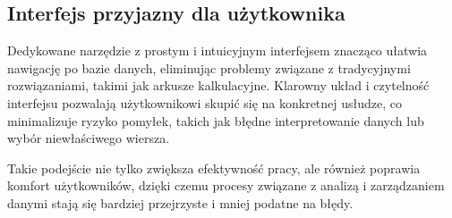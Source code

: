 \subsection{Interfejs przyjazny dla użytkownika}
Dedykowane narzędzie z prostym i intuicyjnym interfejsem znacząco ułatwia nawigację po bazie danych, eliminując problemy związane z tradycyjnymi rozwiązaniami, takimi jak arkusze kalkulacyjne. Klarowny układ i czytelność interfejsu pozwalają użytkownikowi skupić się na konkretnej usłudze, co minimalizuje ryzyko pomyłek, takich jak błędne interpretowanie danych lub wybór niewłaściwego wiersza.

Takie podejście nie tylko zwiększa efektywność pracy, ale również poprawia komfort użytkowników, dzięki czemu procesy związane z analizą i zarządzaniem danymi stają się bardziej przejrzyste i mniej podatne na błędy.